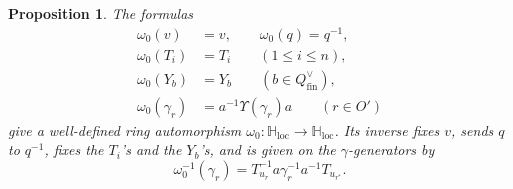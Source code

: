 \documentclass{amsart}
\newtheorem{Prop}[Thm]{Proposition}
\theoremstyle{definition}
\numberwithin{equation}{section}
\begin{document}
\begin{Prop}\label{prop:omega0-endomorphism}
    The formulas
    \begin{align}
        \omega_0(v) & = v,\qquad \omega_0(q)=q^{-1},\\
        \omega_0(T_i) & = T_i \qquad (1\leqslant i\leqslant n),\\
        \omega_0(Y_b) & = Y_b \qquad (b\in Q_{\mathrm{fin}}^\vee),\\
        \omega_0(\gamma_r) & = a^{-1}\Upsilon(\gamma_r)a \qquad (r\in O')
    \end{align}
    give a well-defined ring automorphism
    $\omega_0:\mathbb H_{\mathrm{loc}}\to \mathbb H_{\mathrm{loc}}$.
    Its inverse fixes \(v\), sends \(q\) to \(q^{-1}\), fixes the \(T_i\)'s
    and the \(Y_b\)'s, and is given on the
    \(\gamma\)-generators by
    \[
    \omega_0^{-1}(\gamma_r)
    =
    T_{u_r}^{-1}a\gamma_r^{-1}a^{-1}T_{u_{r^*}}.
    \]
\end{Prop}
\end{document}

